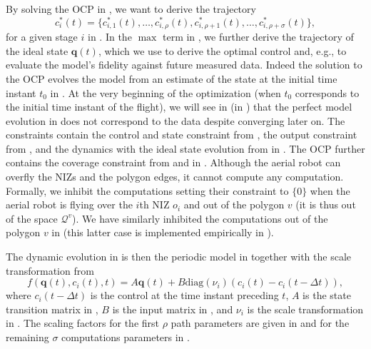 By solving the OCP in , we want to derive the trajectory 
\begin{equation}\label{eq:opti-conf-mpc}
  c_i^*(t)=\{c^*_{i,1}(t),\dots,c^*_{i,\rho}(t),c^*_{i,\rho+1}(t),\dots,c^*_{i,\rho+\sigma}(t)\},
\end{equation}
for a given stage $i$ in . In the $\max$ term in , we further derive the trajectory of the ideal state $\mathbf{q}(t)$, which we use to derive the optimal control and, e.g., to evaluate the model's fidelity against future measured data. Indeed the solution to the OCP evolves the model from an estimate of the state at the initial time instant $t_0$ in . At the very beginning of the optimization (when $t_0$ corresponds to the initial time instant of the flight), we will see in  (in ) that the perfect model evolution in  does not correspond to the data despite converging later on.
The constraints contain the control and state constraint from , the output constraint from , and the dynamics with the ideal state evolution from  in . The OCP further contains the coverage constraint from  and  in . Although the aerial robot can overfly the NIZs and the polygon edges, it cannot compute any computation. Formally, we inhibit the computations setting their constraint to $\{0\}$ when the aerial robot is flying over the $i$th NIZ $o_i$ and out of the polygon $v$ (it is thus out of the space $\mathcal{Q}^v$). We have similarly inhibited the computations out of the polygon $v$ in  (this latter case is implemented empirically in ).

The dynamic evolution in  is then the periodic model in  together with the scale transformation from 
\begin{equation}\label{eq:perf-model-in-mpc}
  f(\mathbf{q}(t),c_i(t),t)=A\mathbf{q}(t)+B\mathrm{diag}(\nu_i)(c_i(t)-c_i(t-\Delta t)),
\end{equation}
where $c_i(t-\Delta t)$ is the control at the time instant preceding $t$, $A$ is the state transition matrix in , $B$ is the input matrix in , and $\nu_i$ is the scale transformation in . The scaling factors for the first $\rho$ path parameters are given in  and for the remaining $\sigma$ computations parameters in .

